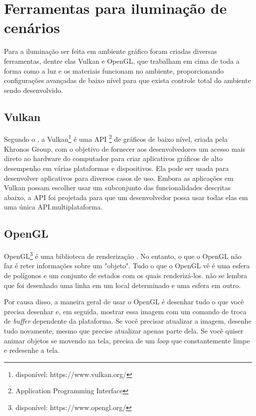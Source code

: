 \section{Ferramentas para iluminação de cenários}

Para a iluminação ser feita em ambiente gráfico foram criadas diversas ferramentas, dentre elas Vulkan e OpenGL, que trabalham em cima de toda a forma como a luz e os materiais funcionam no ambiente, proporcionando configurações avançadas de baixo nível para que exista controle total do ambiente sendo desenvolvido.

\subsection{Vulkan}

Segundo o \cite{Khronos_Group2016-ir}, a Vulkan\footnote{disponível: https://www.vulkan.org/} é uma API \footnote{ Application Programming Interface } de gráficos de baixo nível, criada pela Khronos Group, com o objetivo de fornecer aos desenvolvedores um acesso mais direto ao hardware do computador para criar aplicativos gráficos de alto desempenho em várias plataformas e dispositivos. Ela pode ser usada para desenvolver aplicativos para diversos casos de uso. Embora as aplicações em Vulkan possam escolher usar um subconjunto das funcionalidades descritas abaixo, a API foi projetada para que um desenvolvedor possa usar todas elas em uma única API.multiplataforma.

\subsection{OpenGL}
OpenGL\footnote{disponível: https://www.opengl.org/} é uma biblioteca de renderização \cite{Khronos_Group2022-fq}. No entanto, o que o OpenGL não faz é reter informações sobre um "objeto". Tudo o que o OpenGL vê é uma esfera de polígonos e um conjunto de estados com os quais renderizá-los. não se lembra que foi desenhado uma linha em um local determinado e uma esfera em outro.

Por causa disso, a maneira geral de usar o OpenGL é desenhar tudo o que você precisa desenhar e, em seguida, mostrar essa imagem com um comando de troca de \textit{buffer} dependente da plataforma. Se você precisar atualizar a imagem, desenhe tudo novamente, mesmo que precise atualizar apenas parte dela. Se você quiser animar objetos se movendo na tela, precisa de um \textit{loop} que constantemente limpe e redesenhe a tela.


